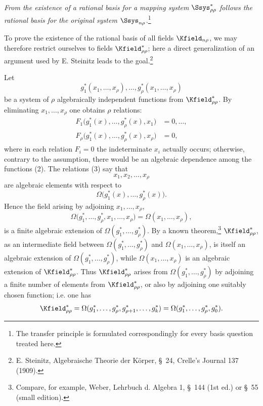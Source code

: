 \documentclass[11pt]{article}
\begin{document}
\emph{From the existence of a rational basis for a mapping system $\Ssys^*_{\rho\rho}$ follows the rational basis for the original system $\Ssys_{n\rho}$.}\footnote{The transfer principle is formulated correspondingly for every basis question treated here.}

To prove the existence of the rational basis of all fields $\Kfield_{n\rho}$, we may therefore restrict ourselves to fields $\Kfield^*_{\rho\rho}$; here a direct generalization of an argument used by E. Steinitz leads to the goal.\footnote{E. Steinitz, Algebraische Theorie der Körper, \S\ 24, Crelle's Journal 137 (1909).}

Let
\begin{equation}
  g_1^*(x_1,\ldots,x_\rho),\ldots,
  g_\rho^*(x_1,\ldots,x_\rho)
\tag{2}
\end{equation}
be a system of $\rho$ algebraically independent functions from $\Kfield^*_{\rho\rho}$. By eliminating $x_1,
\ldots,x_\rho$ one obtains $\rho$ relations:
\begin{equation}
\begin{aligned}
  F_1\bigl(g_1^*(x),\ldots,g_\rho^*(x),x_1\bigr)&=0,\ldots,\\
  F_\rho\bigl(g_1^*(x),\ldots,g_\rho^*(x),x_\rho\bigr)&=0,
\end{aligned}
\tag{3}
\end{equation}
where in each relation $F_i=0$ the indeterminate $x_i$ actually occurs; otherwise, contrary to the assumption, there would be an algebraic dependence among the functions (2). The relations (3) say that
\[
  x_1,x_2,\ldots,x_\rho
\]
are algebraic elements with respect to
\[
  \Omega\bigl(g_1^*(x),\ldots,g_\rho^*(x)\bigr).
\]
Hence the field arising by adjoining $x_1,
\ldots,x_\rho$,
\[
  \Omega\bigl(g_1^*,\ldots,g_\rho^*,x_1,
  \ldots,x_\rho\bigr)=\Omega(x_1,
  \ldots,x_\rho),
\]
is a finite algebraic extension of $\Omega(g_1^*,\ldots,g_\rho^*)$. By a known theorem,\footnote{Compare, for example, Weber, Lehrbuch d. Algebra 1, \S\ 144 (1st ed.) or \S\ 55 (small edition).} $\Kfield^*_{\rho\rho}$, as an intermediate field between $\Omega(g_1^*,\ldots,g_\rho^*)$ and $\Omega(x_1,
\ldots,x_\rho)$, is itself an algebraic extension of $\Omega(g_1^*,\ldots,g_\rho^*)$, while $\Omega(x_1,
\ldots,x_\rho)$ is an algebraic extension of $\Kfield^*_{\rho\rho}$. Thus $\Kfield^*_{\rho\rho}$ arises from $\Omega(g_1^*,\ldots,g_\rho^*)$ by adjoining a finite number of elements from $\Kfield^*_{\rho\rho}$, or also by adjoining one suitably chosen function; i.e. one has
\[
  \Kfield^*_{\rho\rho}
  =\Omega(g_1^*,\ldots,g_\rho^*,g_{\rho+1}^*,\ldots,g_k^*)
  =\Omega(g_1^*,\ldots,g_\rho^*,g_0^*).
\]
\end{document}
